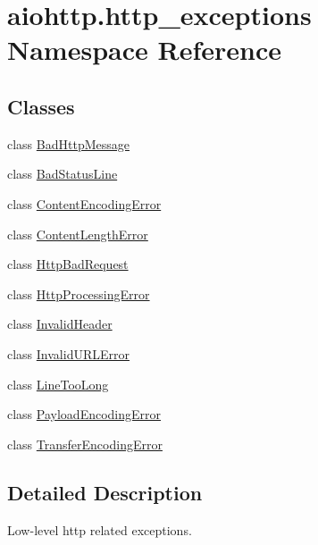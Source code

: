\hypertarget{namespaceaiohttp_1_1http__exceptions}{}\section{aiohttp.\+http\+\_\+exceptions Namespace Reference}
\label{namespaceaiohttp_1_1http__exceptions}
\subsection*{Classes}
\begin{DoxyCompactItemize}
\item 
class \hyperlink{classaiohttp_1_1http__exceptions_1_1_bad_http_message}{Bad\+Http\+Message}
\item 
class \hyperlink{classaiohttp_1_1http__exceptions_1_1_bad_status_line}{Bad\+Status\+Line}
\item 
class \hyperlink{classaiohttp_1_1http__exceptions_1_1_content_encoding_error}{Content\+Encoding\+Error}
\item 
class \hyperlink{classaiohttp_1_1http__exceptions_1_1_content_length_error}{Content\+Length\+Error}
\item 
class \hyperlink{classaiohttp_1_1http__exceptions_1_1_http_bad_request}{Http\+Bad\+Request}
\item 
class \hyperlink{classaiohttp_1_1http__exceptions_1_1_http_processing_error}{Http\+Processing\+Error}
\item 
class \hyperlink{classaiohttp_1_1http__exceptions_1_1_invalid_header}{Invalid\+Header}
\item 
class \hyperlink{classaiohttp_1_1http__exceptions_1_1_invalid_u_r_l_error}{Invalid\+U\+R\+L\+Error}
\item 
class \hyperlink{classaiohttp_1_1http__exceptions_1_1_line_too_long}{Line\+Too\+Long}
\item 
class \hyperlink{classaiohttp_1_1http__exceptions_1_1_payload_encoding_error}{Payload\+Encoding\+Error}
\item 
class \hyperlink{classaiohttp_1_1http__exceptions_1_1_transfer_encoding_error}{Transfer\+Encoding\+Error}
\end{DoxyCompactItemize}


\subsection{Detailed Description}
\begin{DoxyVerb}Low-level http related exceptions.\end{DoxyVerb}
 